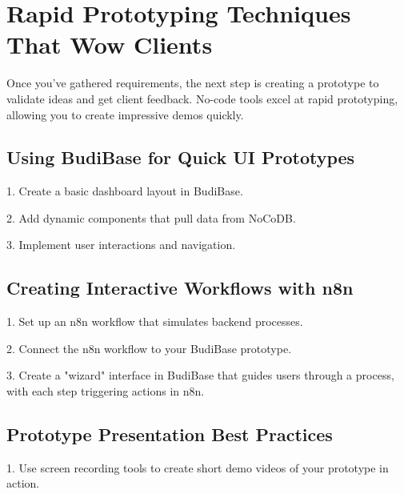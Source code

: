 \section{Rapid Prototyping Techniques That Wow Clients}

Once you've gathered requirements, the next step is creating a prototype to validate ideas and get client feedback. No-code tools excel at rapid prototyping, allowing you to create impressive demos quickly.

\subsection{Using BudiBase for Quick UI Prototypes}

1. Create a basic dashboard layout in BudiBase.


2. Add dynamic components that pull data from NoCoDB.


3. Implement user interactions and navigation.


\subsection{Creating Interactive Workflows with n8n}

1. Set up an n8n workflow that simulates backend processes.


2. Connect the n8n workflow to your BudiBase prototype.


3. Create a "wizard" interface in BudiBase that guides users through a process, with each step triggering actions in n8n.


\subsection{Prototype Presentation Best Practices}

1. Use screen recording tools to create short demo videos of your prototype in action.

